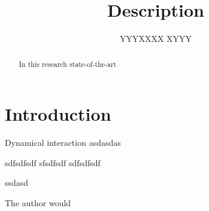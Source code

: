 \documentclass[final,authoryear]{svjour3}
\begin{document}

\title{Description }


\author{YYYXXXX XYYY} %



\maketitle

\begin{abstract}
{
In this research state-of-the-art 
}

\end{abstract}

\section{Introduction}
\label{sec:intro}

Dynamical interaction asdasdas

sdfsdfsdf
sfsdfsdf
sdfsdfsdf


ssdasd




\begin{acknowledgements}
The author would 

\end{acknowledgements}




\end{document}
